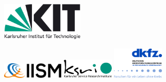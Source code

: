 \begin{titlepage}

	
	
\begin{figure}[htbp]
  
  \begin{minipage}[b]{.2\textwidth}
    \includegraphics[width=4cm]{0_Logos/kit.jpg}  
  \end{minipage}%
  \hfill
  \begin{minipage}[b]{.8\textwidth}
	\begin{flushright}
	    \includegraphics[width=3cm]{0_Logos/IISM_logo.png}
	    \hspace{0.3cm}
        \includegraphics[width=2.5cm]{0_Logos/KSRI_logo.png}  
        \hspace{0.3cm}
        \includegraphics[width=2.5cm]{0_Logos/DKFZ_cropped.png}
	\end{flushright}
  \end{minipage}
  
\end{figure}


\end{titlepage}
